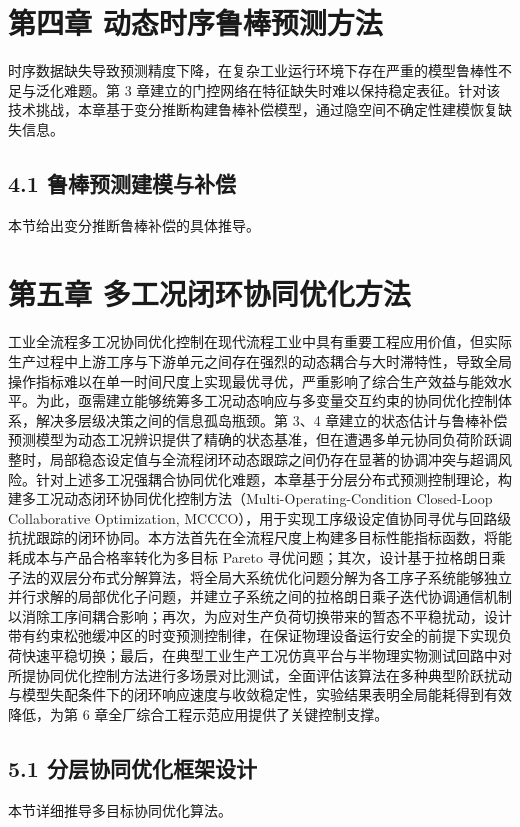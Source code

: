 \documentclass{ctexbook}
\begin{document}
\chapter{第四章 动态时序鲁棒预测方法}
时序数据缺失导致预测精度下降，在复杂工业运行环境下存在严重的模型鲁棒性不足与泛化难题。第 3 章建立的门控网络在特征缺失时难以保持稳定表征。针对该技术挑战，本章基于变分推断构建鲁棒补偿模型，通过隐空间不确定性建模恢复缺失信息。

\section{4.1 鲁棒预测建模与补偿}
本节给出变分推断鲁棒补偿的具体推导。

\chapter{第五章 多工况闭环协同优化方法}
工业全流程多工况协同优化控制在现代流程工业中具有重要工程应用价值，但实际生产过程中上游工序与下游单元之间存在强烈的动态耦合与大时滞特性，导致全局操作指标难以在单一时间尺度上实现最优寻优，严重影响了综合生产效益与能效水平。为此，亟需建立能够统筹多工况动态响应与多变量交互约束的协同优化控制体系，解决多层级决策之间的信息孤岛瓶颈。第 3、4 章建立的状态估计与鲁棒补偿预测模型为动态工况辨识提供了精确的状态基准，但在遭遇多单元协同负荷阶跃调整时，局部稳态设定值与全流程闭环动态跟踪之间仍存在显著的协调冲突与超调风险。针对上述多工况强耦合协同优化难题，本章基于分层分布式预测控制理论，构建多工况动态闭环协同优化控制方法（Multi-Operating-Condition Closed-Loop Collaborative Optimization, MCCCO），用于实现工序级设定值协同寻优与回路级抗扰跟踪的闭环协同。本方法首先在全流程尺度上构建多目标性能指标函数，将能耗成本与产品合格率转化为多目标 Pareto 寻优问题；其次，设计基于拉格朗日乘子法的双层分布式分解算法，将全局大系统优化问题分解为各工序子系统能够独立并行求解的局部优化子问题，并建立子系统之间的拉格朗日乘子迭代协调通信机制以消除工序间耦合影响；再次，为应对生产负荷切换带来的暂态不平稳扰动，设计带有约束松弛缓冲区的时变预测控制律，在保证物理设备运行安全的前提下实现负荷快速平稳切换；最后，在典型工业生产工况仿真平台与半物理实物测试回路中对所提协同优化控制方法进行多场景对比测试，全面评估该算法在多种典型阶跃扰动与模型失配条件下的闭环响应速度与收敛稳定性，实验结果表明全局能耗得到有效降低，为第 6 章全厂综合工程示范应用提供了关键控制支撑。

\section{5.1 分层协同优化框架设计}
本节详细推导多目标协同优化算法。
\end{document}

